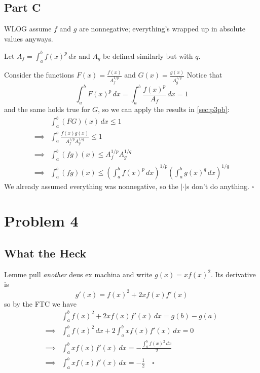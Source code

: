 \documentclass[12pt]{article}
\begin{document}
\pagebreak

\subsection{Part C}

WLOG assume $f$ and $g$ are nonnegative; everything's wrapped up in absolute values anyways.

Let $A_f=\int_{a}^{b} f(x)^p\,dx$ and $A_g$ be defined similarly but with $q$.

Consider the functions $F(x)=\frac{f(x)}{A_f^{1/p}}$ and $G(x)=\frac{g(x)}{A_g^{1/q}}$
Notice that
\[\int_{a}^{b} F(x)^p\,dx=\int_{a}^{b} \frac{f(x)^p}{A_f}\,dx=1\]
and the same holds true for $G$, so we can apply the results in \ref{sec:p3pb}:
\begin{align*}
  & \int_{a}^{b} (FG)(x)\,dx \le 1 \\
  \implies{} & \int_{a}^{b} \frac{f(x)g(x)}{A_f^{1/p}A_g^{1/q}} \le 1 \\
  \implies{} & \int_{a}^{b} (fg)(x) \le A_f^{1/p}A_g^{1/q} \\
  \implies{} & \int_{a}^{b} (fg)(x) \le \left(\int_{a}^{b} f(x)^p\,dx\right)^{1/p}\left(\int_{a}^{b} g(x)^q\,dx\right)^{1/q}
\end{align*}
We already assumed everything was nonnegative, so the $|\cdot|$s don't do anything. $\square$

\pagebreak

\section{Problem 4}

\subsection{What the Heck}

Lemme pull \textit{another} deus ex machina and write $g(x)=xf(x)^2$.
Its derivative is
\[g'(x)=f(x)^2+2xf(x)f'(x)\]
so by the FTC we have
\begin{align*}
  & \int_{a}^{b} f(x)^2+2xf(x)f'(x)\,dx = g(b)-g(a) \\
  \implies{} & \int_{a}^{b} f(x)^2\,dx+2\int_{a}^{b} xf(x)f'(x)\,dx = 0 \\
  \implies{} & \int_{a}^{b} xf(x)f'(x)\,dx=-\frac{\int_{a}^{b} f(x)^2\,dx}{2} \\
  \implies{} & \int_{a}^{b} xf(x)f'(x)\,dx=-\frac{1}{2}\quad\square
\end{align*}
\end{document}
